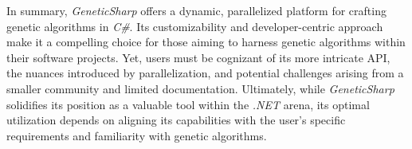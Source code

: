   In summary, \textit{GeneticSharp} offers a dynamic, parallelized platform for 
  crafting genetic algorithms in \textit{C\#}. 
  Its customizability and developer-centric approach make it a compelling choice 
  for those aiming to harness genetic algorithms within their software projects. 
  Yet, users must be cognizant of its more intricate API, the nuances introduced 
  by parallelization, and potential challenges arising from a smaller community 
  and limited documentation.
  Ultimately, while \textit{GeneticSharp} solidifies its position as a valuable 
  tool within the \textit{.NET} arena, its optimal utilization depends on 
  aligning its capabilities with the user's specific requirements and 
  familiarity with genetic algorithms.
